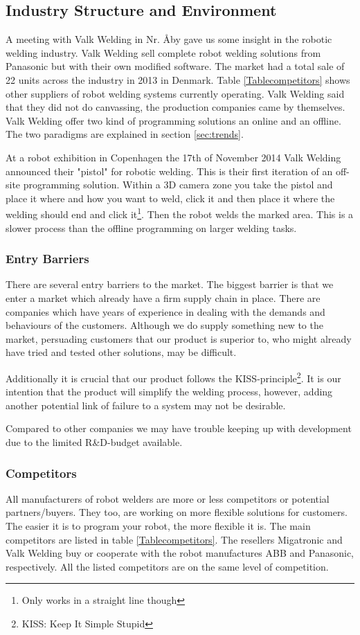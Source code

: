 \subsection{Industry Structure and Environment}
\label{ind.struc}
A meeting with Valk Welding in Nr. Åby\cite{valk_welding_summary} gave us some insight in the robotic welding industry. 
Valk Welding sell complete robot welding solutions from Panasonic but with their own modified software. 
The market had a total sale of 22 units across the industry in 2013 in Denmark. 
Table \ref{Tablecompetitors} shows other suppliers of robot welding systems currently operating. 
Valk Welding said that they did not do canvassing, the production companies came by themselves. 
Valk Welding offer two kind of programming solutions an online and an offline. The two paradigms are explained in section \ref{sec:trends}.

At a robot exhibition in Copenhagen the 17th of November 2014 Valk Welding announced their "pistol" for robotic welding. This is their first iteration of an off-site programming solution. Within a 3D camera zone you take the pistol and place it where and how you want to weld, click it and then place it where the welding should end and click it\footnote{Only works in a straight line though}. Then the robot welds the marked area. This is a slower process than the offline programming on larger welding tasks.
\subsubsection{Entry Barriers}
There are several entry barriers to the market. The biggest barrier is that we enter a market which already have a firm supply chain in place. There are companies which have years of experience in dealing with the demands and behaviours of the customers. Although we do supply something new to the market, persuading customers that our product is superior to, who might already have tried and tested other solutions, may be difficult.

Additionally it is crucial that our product follows the KISS-principle\footnote{KISS: Keep It Simple Stupid}. It is our intention that the product will simplify the welding process, however, adding another potential link of failure to a system may not be desirable.

Compared to other companies we may have trouble keeping up with development due to the limited R\&D-budget available.
\subsubsection{Competitors}
\label{competitors}
All manufacturers of robot welders are more or less competitors or potential partners/buyers. They too, are working on more flexible solutions for customers. The easier it is to program your robot, the more flexible it is. The main competitors are listed in table \ref{Tablecompetitors}. The resellers Migatronic and Valk Welding buy or cooperate with the robot manufactures ABB and Panasonic, respectively. All the listed competitors are on the same level of competition.


